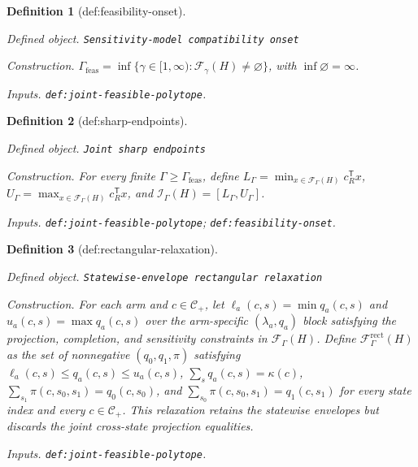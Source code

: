 \documentclass{article}
\newtheorem{definition}{Definition}
\begin{document}
\begin{definition}[def:feasibility-onset]\label{def:feasibility-onset}
\par\smallskip\noindent\emph{Defined object.} \texttt{Sensitivity-\allowbreak{}model compatibility onset}
\par\smallskip\noindent\emph{Construction.} \(\Gamma_{\mathrm{feas}}=\inf\{\gamma\in[1,\infty):\mathcal F_{\gamma}(H)\ne\varnothing\}\), with \(\inf\varnothing=\infty\).
\par\smallskip\noindent\emph{Inputs.} \texttt{def:\allowbreak{}joint-\allowbreak{}feasible-\allowbreak{}polytope}.
\end{definition}

\begin{definition}[def:sharp-endpoints]\label{def:sharp-endpoints}
\par\smallskip\noindent\emph{Defined object.} \texttt{Joint sharp endpoints}
\par\smallskip\noindent\emph{Construction.} For every finite \(\Gamma\ge\Gamma_{\mathrm{feas}}\), define \(L_{\Gamma}=\min_{x\in\mathcal F_{\Gamma}(H)}c_R^{\mathsf T}x\), \(U_{\Gamma}=\max_{x\in\mathcal F_{\Gamma}(H)}c_R^{\mathsf T}x\), and \(\mathcal I_{\Gamma}(H)=[L_{\Gamma},U_{\Gamma}]\).
\par\smallskip\noindent\emph{Inputs.} \texttt{def:\allowbreak{}joint-\allowbreak{}feasible-\allowbreak{}polytope}; \texttt{def:\allowbreak{}feasibility-\allowbreak{}onset}.
\end{definition}

\begin{definition}[def:rectangular-relaxation]\label{def:rectangular-relaxation}
\par\smallskip\noindent\emph{Defined object.} \texttt{Statewise-\allowbreak{}envelope rectangular relaxation}
\par\smallskip\noindent\emph{Construction.} For each arm and \(c\in\mathcal C_{+}\), let \(\ell_a(c,s)=\min q_a(c,s)\) and \(u_a(c,s)=\max q_a(c,s)\) over the arm-specific \((\lambda_a,q_a)\) block satisfying the projection, completion, and sensitivity constraints in \(\mathcal F_{\Gamma}(H)\). Define \(\mathcal F^{\mathrm{rect}}_{\Gamma}(H)\) as the set of nonnegative \((q_0,q_1,\pi)\) satisfying \(\ell_a(c,s)\le q_a(c,s)\le u_a(c,s)\), \(\sum_s q_a(c,s)=\kappa(c)\), \(\sum_{s_1}\pi(c,s_0,s_1)=q_0(c,s_0)\), and \(\sum_{s_0}\pi(c,s_0,s_1)=q_1(c,s_1)\) for every state index and every \(c\in\mathcal C_{+}\). This relaxation retains the statewise envelopes but discards the joint cross-state projection equalities.
\par\smallskip\noindent\emph{Inputs.} \texttt{def:\allowbreak{}joint-\allowbreak{}feasible-\allowbreak{}polytope}.
\end{definition}
\end{document}
